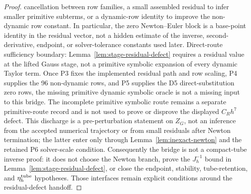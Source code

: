 \documentclass[preprint,12pt]{elsarticle}
\begin{document}
\begin{proof}
cancellation between row families, a small assembled residual to infer smaller
primitive subterms, or a dynamic-row identity to improve the non-dynamic row
constant.  In particular, the zero Newton--Euler block is a base-point
identity in the residual vector, not a hidden estimate of the inverse,
second-derivative, endpoint, or solver-tolerance constants used later.
Direct-route sufficiency boundary: Lemma~\ref{lem:stage-residual-defect}
requires a residual value at the lifted Gauss stage, not a primitive symbolic
expansion of every dynamic Taylor term. Once P3 fixes the implemented residual
path and row scaling, P4 supplies the 96 non-dynamic rows, and P5 supplies the
D5 direct-substitution zero rows, the missing primitive dynamic symbolic
oracle is not a missing input to this bridge. The incomplete primitive
symbolic route remains a separate primitive-route record and is not used to prove or
disprove the displayed \(C_Rh^7\) defect.
This discharge is a pre-perturbation statement on \(Z_G\), not an inference
from the accepted numerical trajectory or from small residuals after Newton
termination; the latter enter only through Lemma~\ref{lem:inexact-newton} and
the retained P6 solver-scale condition. Consequently the bridge is not a
compact-tube inverse proof: it does not choose the Newton branch, prove the
\(J_h^{-1}\) bound in Lemma~\ref{lem:stage-residual-defect}, or close the
endpoint, stability, tube-retention, and \(\eta_h^{\rm tube}\) hypotheses.
Those interfaces remain explicit conditions around the residual-defect
handoff.
\end{proof}
\end{document}
